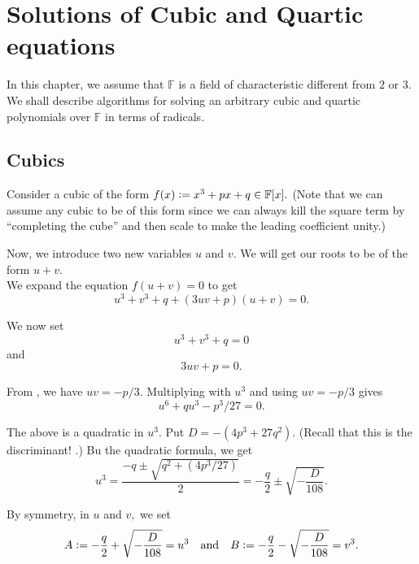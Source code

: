 \chapter{Solutions of Cubic and Quartic equations}

In this chapter, we assume that $\mathbb{F}$ is a field of characteristic different from $2$ or $3.$ We shall describe algorithms for solving an arbitrary cubic and quartic polynomials over $\mathbb{F}$ in terms of radicals.

\section{Cubics}

Consider a cubic of the form $f(x) \vcentcolon= x^3 + px + q \in \mathbb{F}[x].$ (Note that we can assume any cubic to be of this form since we can always kill the square term by ``completing the cube'' and then scale to make the leading coefficient unity.)

Now, we introduce two new variables $u$ and $v.$ We will get our roots to be of the form $u + v.$ \\
We expand the equation $f(u + v) = 0$ to get
\begin{equation*} 
	u^3 + v^3 + q + (3uv + p)(u + v) = 0.
\end{equation*}

We now set
\begin{equation} \label{eq:008}
	u^3 + v^3 + q = 0
\end{equation}
and
\begin{equation} \label{eq:009}
	3uv + p = 0.
\end{equation}

From , we have $uv = -p/3.$ Multiplying  with $u^3$ and using $uv = -p/3$ gives
\begin{equation*} 
	u^6 + qu^3 - p^3/27 = 0.
\end{equation*}

The above is a quadratic in $u^3.$ Put $D = -(4p^3 + 27q^2).$ (Recall that this is the discriminant! .) Bu the quadratic formula, we get
\begin{equation*} 
	u^3 = \frac{-q \pm \sqrt{q^2 + (4p^3/27)}}{2} = -\frac{q}{2} \pm \sqrt{-\frac{D}{108}}.
\end{equation*}

By symmetry, in $u$ and $v,$ we set
\begin{equation*} 
	A \vcentcolon= -\frac{q}{2} + \sqrt{-\frac{D}{108}} = u^3 \quad\text{and}\quad B \vcentcolon= -\frac{q}{2} - \sqrt{-\frac{D}{108}} = v^3.
\end{equation*}

